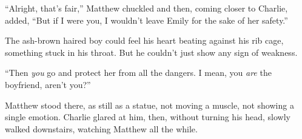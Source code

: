 “Alright, that's fair,” Matthew chuckled and then, coming closer to Charlie, added, “But if I were you, I wouldn't leave Emily for the sake of her safety.”

The ash-brown haired boy could feel his heart beating against his rib cage, something stuck in his throat. But he couldn't just show any sign of weakness.

“Then \textit{you} go and protect her from all the dangers. I mean, you \textit{are} the boyfriend, aren't you?”

Matthew stood there, as still as a statue, not moving a muscle, not showing a single emotion. Charlie glared at him, then, without turning his head, slowly walked downstairs, watching Matthew all the while.